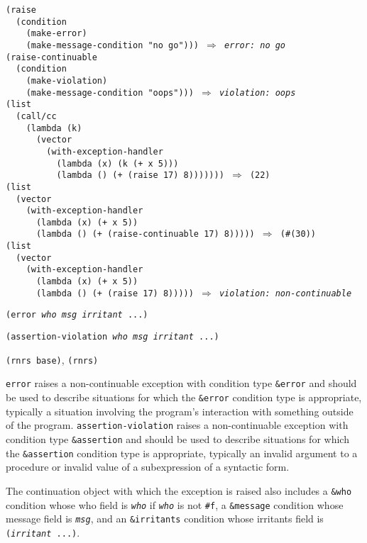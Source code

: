 \begin{alltt}
(raise
  (condition
    (make-error)
    (make-message-condition "no go"))) \(\Rightarrow\) \textit{error: no go}
(raise-continuable
  (condition
    (make-violation)
    (make-message-condition "oops"))) \(\Rightarrow\) \textit{violation: oops}
(list
  (call/cc
    (lambda (k)
      (vector
        (with-exception-handler
          (lambda (x) (k (+ x 5)))
          (lambda () (+ (raise 17) 8))))))) \(\Rightarrow\) (22)
(list
  (vector
    (with-exception-handler
      (lambda (x) (+ x 5))
      (lambda () (+ (raise-continuable 17) 8))))) \(\Rightarrow\) (\#{}(30))
(list
  (vector
    (with-exception-handler
      (lambda (x) (+ x 5))
      (lambda () (+ (raise 17) 8))))) \(\Rightarrow\) \textit{violation: non-continuable}
\end{alltt}

\begin{description}

\label{exceptions_s4}\item[procedure] \texttt{(error \textit{who} \textit{msg} \textit{irritant} ...)}



\item[procedure] \texttt{(assertion-violation \textit{who} \textit{msg} \textit{irritant} ...)}



\item[libraries] \texttt{(rnrs base)}, \texttt{(rnrs)}
\end{description}

\texttt{error} raises a non-continuable exception with condition type
\texttt{\&{}error} and should be used to describe situations for which the
\texttt{\&{}error} condition type is appropriate, typically a situation
involving the program's interaction with something outside of the program.
\texttt{assertion-violation} raises a non-continuable exception with
condition type \texttt{\&{}assertion} and should be used to describe
situations for which the \texttt{\&{}assertion} condition type is
appropriate, typically an invalid argument to a procedure or invalid value
of a subexpression of a syntactic form.

The continuation object with which the exception is raised also includes
a \texttt{\&{}who} condition whose who field is \texttt{\textit{who}} if \texttt{\textit{who}} is
not \texttt{\#{}f}, a \texttt{\&{}message} condition whose message field is
\texttt{\textit{msg}}, and an \texttt{\&{}irritants} condition whose irritants field
is \texttt{(\textit{irritant} ...)}.

